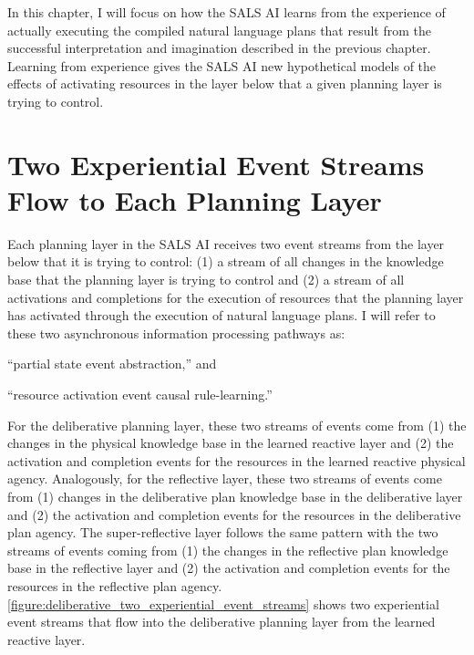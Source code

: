 In this chapter, I will focus on how the SALS AI learns from the
experience of actually executing the compiled natural language plans
that result from the successful interpretation and imagination
described in the previous chapter.  Learning from experience gives the
SALS AI new hypothetical models of the effects of activating resources
in the layer below that a given planning layer is trying to control.

\section{Two Experiential Event Streams Flow to Each Planning Layer}

Each planning layer in the SALS AI receives two event streams from the
layer below that it is trying to control: (1) a stream of all changes
in the knowledge base that the planning layer is trying to control and
(2) a stream of all activations and completions for the execution of
resources that the planning layer has activated through the execution
of natural language plans.  I will refer to these two asynchronous information processing pathways as:
\begin{packed_enumerate}
\item{``partial state event abstraction,'' and}
\item{``resource activation event causal rule-learning.''}
\end{packed_enumerate}
For the deliberative planning layer, these two streams of events come
from (1) the changes in the physical knowledge base in the learned
reactive layer and (2) the activation and completion events for the
resources in the learned reactive physical agency.  Analogously, for
the reflective layer, these two streams of events come from (1)
changes in the deliberative plan knowledge base in the deliberative
layer and (2) the activation and completion events for the resources
in the deliberative plan agency.  The super-reflective layer follows
the same pattern with the two streams of events coming from (1) the
changes in the reflective plan knowledge base in the reflective layer
and (2) the activation and completion events for the resources in the
reflective plan agency.
{\mbox{\autoref{figure:deliberative_two_experiential_event_streams}}}
shows two experiential event streams that flow into the deliberative
planning layer from the learned reactive layer.
